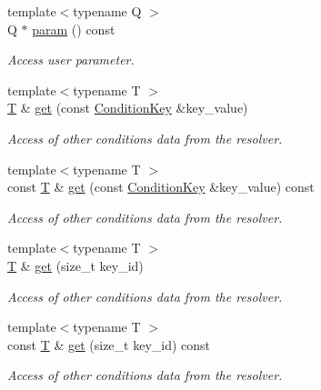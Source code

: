 \begin{DoxyCompactItemize}
{\footnotesize template$<$typename Q $>$ }\\Q $\ast$ \hyperlink{class_d_d4hep_1_1_conditions_1_1_condition_update_context_a64bd2c39aa3e4d989d2cd0898606e8a7}{param} () const 
\begin{DoxyCompactList}\small\item\em Access user parameter. \item\end{DoxyCompactList}\item 
{\footnotesize template$<$typename T $>$ }\\\hyperlink{class_t}{T} \& \hyperlink{class_d_d4hep_1_1_conditions_1_1_condition_update_context_a3c3196d5e62a01a41f6cab49aecb948e}{get} (const \hyperlink{class_d_d4hep_1_1_conditions_1_1_condition_key}{ConditionKey} \&key\_\-value)
\begin{DoxyCompactList}\small\item\em Access of other conditions data from the resolver. \item\end{DoxyCompactList}\item 
{\footnotesize template$<$typename T $>$ }\\const \hyperlink{class_t}{T} \& \hyperlink{class_d_d4hep_1_1_conditions_1_1_condition_update_context_a5f11d0ff6f0c68a535646bdc4260ec94}{get} (const \hyperlink{class_d_d4hep_1_1_conditions_1_1_condition_key}{ConditionKey} \&key\_\-value) const 
\begin{DoxyCompactList}\small\item\em Access of other conditions data from the resolver. \item\end{DoxyCompactList}\item 
{\footnotesize template$<$typename T $>$ }\\\hyperlink{class_t}{T} \& \hyperlink{class_d_d4hep_1_1_conditions_1_1_condition_update_context_ab2e3942153fd60a5be7e30771a18fd7f}{get} (size\_\-t key\_\-id)
\begin{DoxyCompactList}\small\item\em Access of other conditions data from the resolver. \item\end{DoxyCompactList}\item 
{\footnotesize template$<$typename T $>$ }\\const \hyperlink{class_t}{T} \& \hyperlink{class_d_d4hep_1_1_conditions_1_1_condition_update_context_a34da25c719917d2602a8cb0db15fbfa4}{get} (size\_\-t key\_\-id) const 
\begin{DoxyCompactList}\small\item\em Access of other conditions data from the resolver. \item\end{DoxyCompactList}\end{DoxyCompactItemize}

